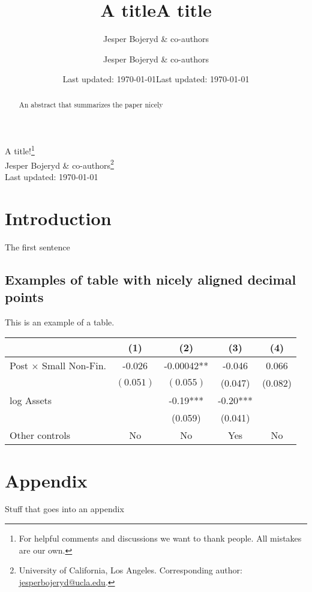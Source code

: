 \documentclass[12pt,letter]{article}
\title{A title}
\date{Last updated: \today}
\author{Jesper Bojeryd \& co-authors}
\title{A title}
\date{Last updated: \today}
\author{Jesper Bojeryd \& co-authors}
\begin{document}
 
\begingroup 
\renewcommand{\thefootnote}{\fnsymbol{footnote}}
  \centering 
  \LARGE A title!\footnote{For helpful comments and discussions we want to thank people. All mistakes are our own.} \\[0.2em]
  \large Jesper Bojeryd \& co-authors\footnote{University of California, Los Angeles. Corresponding author: \url{jesperbojeryd@ucla.edu}.}\\[0.5em]
  Last updated: \today
  \\[1em]\par
\endgroup

\setcounter{footnote}{0}%

\begin{abstract}
    \noindent An abstract that summarizes the paper nicely
\end{abstract}

\section{Introduction}
The first sentence

\subsection{Examples of table with nicely aligned decimal points}
This is an example of a table.

\begin{table}[h]\centering
{}
    \begin{tabular}{lS[table-format=-1.3]S[table-format=-1.7]S[table-format=-1.5]S[table-format=-1.4]}
    \hline
                        & {(1)} & {(2)} & {(3)} & {(4)} \\
    \hline
    {Post $\times$ Small Non-Fin.} & -0.026 & -0.00042** & -0.046 & 0.066 \\
                        & {$(0.051)$} & {$(0.055)$} & {(}0.047{) }& {(}0.082{)} \\
    {log Assets} & & -0.19***& -0.20***& \\
                        & & {(}0.059{)} & {(}0.041{)} &%
                        \\
    {Other controls} & {No} & {No} & {Yes} & {No} \\
    \hline
    \end{tabular}
\end{table}





\newpage\clearpage
\appendix 
\setcounter{figure}{0} \renewcommand{\thefigure}{A\arabic{figure}}
\setcounter{table}{0} \renewcommand{\thetable}{A\arabic{table}}

\section*{Appendix}
Stuff that goes into an appendix
\end{document}
